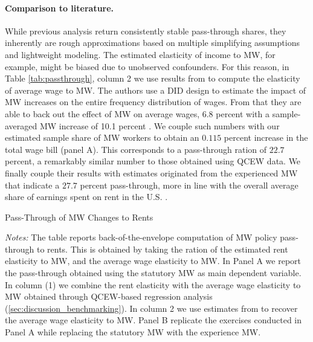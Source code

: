 \paragraph{Comparison to literature.} While previous analysis return consistently stable 
pass-through shares, they inherently are rough approximations based on multiple simplifying 
assumptions and lightweight modeling. The estimated elasticity of income to MW, for example, 
might be biased due to unobserved confounders. For this reason, in Table \ref{tab:passthrough}, 
column 2 we use results from \textcite{CegnizEtAl2019} to compute the elasticity of 
average wage to MW. The authors use a DID design to estimate the impact of 
MW increases on the entire frequency distribution of wages. From that they are able to back out the effect of 
MW on average wages, 6.8 percent with a sample-averaged MW increase of 10.1 percent 
\parencite[Table I]{CegnizEtAl2019}. We couple such numbers with our estimated sample share 
of MW workers to obtain an $0.115$ percent increase in the total wage bill (panel A). This corresponds to 
a pass-through ration of $22.7$ percent, a remarkably similar number to those obtained using 
QCEW data. We finally couple their results with estimates originated from the experienced MW that
indicate a $27.7$ percent pass-through, more in line with the 
overall average share of earnings spent on rent in the U.S. \parencite{fernald2020americas}.   

\begin{table}[!h] 
	\centering
	\caption{Pass-Through of MW Changes to Rents}
	\label{tab:passthrough}  
	
	\begin{minipage}{\textwidth} \footnotesize
		\vspace{2mm}
		\textit{Notes:} The table reports back-of-the-envelope computation of MW 
		policy pass-through to rents. This is obtained by taking the ration of the 
		estimated rent elasticity to MW, and the average wage elasticity to MW. 
		In Panel A we report the pass-through obtained using the statutory MW as 
		main dependent variable. In column (1) we combine the rent elasticity with 
		the average wage elasticity to MW obtained through QCEW-based regression
		analysis (\autoref{sec:discussion_benchmarking}). In column 2 we use estimates
		from \textcite{CegnizEtAl2019} to recover the average wage elasticity to MW. 
		Panel B replicate the exercises conducted in Panel A while replacing the statutory
		MW with the experience MW. 
	\end{minipage}
\end{table}

